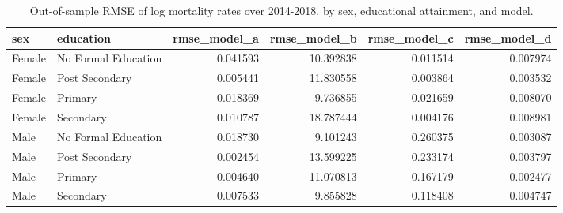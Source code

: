 \begin{table}[ht]
\centering
\begin{tabular}{llrrrr}
\hline
sex & education & rmse_model_a & rmse_model_b & rmse_model_c & rmse_model_d \\
\hline
Female & No Formal Education & 0.041593 & 10.392838 & 0.011514 & 0.007974 \\
Female & Post Secondary & 0.005441 & 11.830558 & 0.003864 & 0.003532 \\
Female & Primary & 0.018369 & 9.736855 & 0.021659 & 0.008070 \\
Female & Secondary & 0.010787 & 18.787444 & 0.004176 & 0.008981 \\
Male & No Formal Education & 0.018730 & 9.101243 & 0.260375 & 0.003087 \\
Male & Post Secondary & 0.002454 & 13.599225 & 0.233174 & 0.003797 \\
Male & Primary & 0.004640 & 11.070813 & 0.167179 & 0.002477 \\
Male & Secondary & 0.007533 & 9.855828 & 0.118408 & 0.004747 \\
\hline
\end{tabular}
\caption{Out-of-sample RMSE of log mortality rates over 2014-2018, by sex, educational attainment, and model.}
\label{tab:revised_table_e1}
\end{table}
